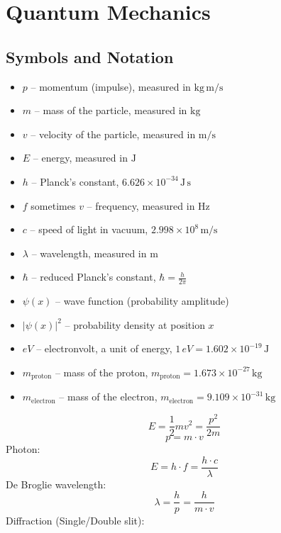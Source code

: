 \section{Quantum Mechanics}
\subsection{Symbols and Notation}
\begin{itemize}
    \item $p$ -- momentum (impulse), measured in $\mathrm{kg\,m/s}$
    \item $m$ -- mass of the particle, measured in $\mathrm{kg}$
    \item $v$ -- velocity of the particle, measured in $\mathrm{m/s}$
    \item $E$ -- energy, measured in $\mathrm{J}$
    \item $h$ -- Planck's constant, $6.626 \times 10^{-34}\,\mathrm{J\,s}$
    \item $f$ sometimes $v$ -- frequency, measured in $\mathrm{Hz}$
    \item $c$ -- speed of light in vacuum, $2.998 \times 10^8\,\mathrm{m/s}$
    \item $\lambda$ -- wavelength, measured in $\mathrm{m}$
    \item $\hbar$ -- reduced Planck's constant, $\hbar = \frac{h}{2\pi}$
    \item $\psi(x)$ -- wave function (probability amplitude)
    \item $|\psi(x)|^2$ -- probability density at position $x$
    \item \(eV\) -- electronvolt, a unit of energy, \(1\,eV = 1.602 \times 10^{-19}\,\mathrm{J}\)
    \item \(m_{\text{proton}}\) -- mass of the proton, \(m_{\text{proton}} = 1.673 \times 10^{-27}\,\mathrm{kg}\)
    \item \(m_{\text{electron}}\) -- mass of the electron, \(m_{\text{electron}} = 9.109 \times 10^{-31}\,\mathrm{kg}\)
\end{itemize}
\[
E = \frac{1}{2} m v^2 = \frac{p^2}{2m}
\]
\begin{equation*}
    p = m \cdot v
\end{equation*}
Photon:
\begin{equation*}
    E = h \cdot f = \frac{h \cdot c}{\lambda}
\end{equation*}
De Broglie wavelength:
\begin{equation*}
    \lambda = \frac{h}{p} = \frac{h}{m \cdot v}
\end{equation*}
Diffraction (Single/Double slit):


